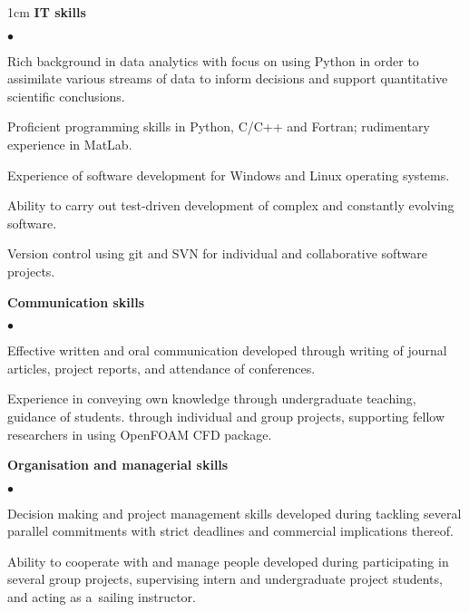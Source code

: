 \documentclass[a4paper,10pt]{article}
\newcommand{\squishlist}{
	\begin{list}{$\bullet$}
	{
		\setlength{\itemsep}{0pt}
		\setlength{\parsep}{0pt}
		\setlength{\topsep}{0pt}
		\setlength{\partopsep}{0pt}
		\setlength{\leftmargin}{2em}
		\setlength{\labelwidth}{1.5em}
		\setlength{\labelsep}{0.5em}
	}
}
\newcommand{\squishend}{\end{list}}
\begin{document}
\begin{minipage}{\textwidth}
\begin{adjustwidth}{}{1cm}
\textbf{IT skills}
\squishlist
	\item Rich background in data analytics with focus on using Python in order to assimilate various streams of
		data to inform decisions and support quantitative scientific conclusions.
	\item Proficient programming skills in Python, C/C++ and Fortran; rudimentary experience in MatLab.
	\item Experience of software development for Windows and Linux operating systems.
	\item Ability to carry out test-driven development of complex and constantly evolving software.
	\item Version control using git and SVN for individual and collaborative software projects.
\squishend

\textbf{Communication skills}
\squishlist
	\item Effective written and oral communication developed through writing of journal articles,
		project reports, and attendance of conferences.
	\item Experience in conveying own knowledge through undergraduate teaching, guidance of students.
		through individual and group projects, supporting fellow researchers in using OpenFOAM CFD package.
\squishend

\textbf{Organisation and managerial skills}
\squishlist
	\item Decision making and project management skills developed during tackling several parallel commitments with strict deadlines
		and commercial implications thereof.
	\item Ability to cooperate with and manage people developed during participating in several group
		projects, supervising intern and undergraduate project students, and acting as a~sailing instructor.
\squishend

\end{adjustwidth}
\end{minipage}
\end{document}
